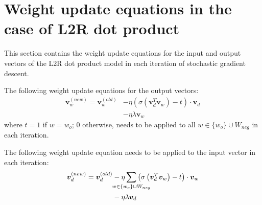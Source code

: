 \documentclass[11pt,a4paper]{article}
\begin{document}
\section{Weight update equations in the case of L2R dot product}
This section contains the weight update equations for the input and output vectors of the L2R dot product model in each iteration of stochastic gradient descent.

The following weight update equations for the output vectors:
\begin{align}
\mathbold{v}_w^{(new)} = \mathbold{v}_w^{(old)} &- \eta \left( \sigma \left( \mathbold{v}_d^T \mathbold{v}_w \right) - t \right) \cdot \mathbold{v}_d \nonumber \\
&- \eta \lambda \mathbold{v}_w
\end{align}
where $t = 1$ if $w = w_o$; $0$ otherwise, needs to be applied to all $w \in \{w_o\} \cup W_{neg}$ in each iteration.

The following weight update equation needs to be applied to the input vector in each iteration:
\begin{align}
\mathbold{v}_d^{(new)} = \mathbold{v}_d^{(old)} &- \eta \sum_{\mathclap{w \in \{w_o\} \cup W_{neg}}} \left( \sigma \left( \mathbold{v}_d^T \mathbold{v}_w \right) - t \right) \cdot \mathbold{v}_w \nonumber \\
&- \eta \lambda \mathbold{v}_d
\end{align}
\end{document}
